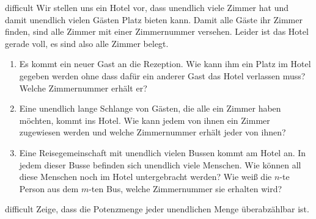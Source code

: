 \documentclass[../abbildungen.tex]{subfiles}
\begin{document}
\begin{exercise}{difficult}
    Wir stellen uns ein Hotel vor, dass unendlich viele Zimmer hat und damit unendlich vielen Gästen Platz bieten kann. Damit alle Gäste ihr Zimmer finden, sind alle Zimmer mit einer Zimmernummer versehen. Leider ist das Hotel gerade voll, es sind also alle Zimmer belegt.
    \begin{enumerate}
        \item Es kommt ein neuer Gast an die Rezeption. Wie kann ihm ein Platz im Hotel gegeben werden ohne dass dafür ein anderer Gast das Hotel verlassen muss? Welche Zimmernummer erhält er?
        \item Eine unendlich lange Schlange von Gästen, die alle ein Zimmer haben möchten, kommt ins Hotel. Wie kann jedem von ihnen ein Zimmer zugewiesen werden und welche Zimmernummer erhält jeder von ihnen?
        \item Eine Reisegemeinschaft mit unendlich vielen Bussen kommt am Hotel an. In jedem dieser Busse befinden sich unendlich viele Menschen. Wie können all diese Menschen noch im Hotel untergebracht werden? Wie weiß die $n$-te Person aus dem $m$-ten Bus, welche Zimmernummer sie erhalten wird?
    \end{enumerate}
\end{exercise}

\begin{exercise}{difficult}
    Zeige, dass die Potenzmenge jeder unendlichen Menge überabzählbar ist.
\end{exercise}
\end{document}
